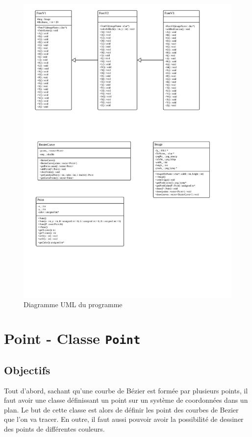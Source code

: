 \documentclass[a4paper, 12pt]{article}
\begin{document}
\begin{figure}[h]
\centering
\includegraphics[trim= 0 13cm 0 0, clip, width=160mm]{Images/DiagramUML.jpg}
\caption{Diagramme UML du programme}
\label{fig1}
\end{figure}

\newpage
\section{Point - Classe \texttt{Point}}	
\subsection{Objectifs}
	Tout d'abord, sachant qu'une courbe de Bézier est formée par plusieurs points, il faut avoir une classe définissant un point sur un système de coordonnées dans un plan. Le but de cette classe est alors de définir les point des courbes de Bezier que l'on va tracer. En outre, il faut aussi pouvoir avoir la possibilité de dessiner des points de différentes couleurs.
	
\end{document}
